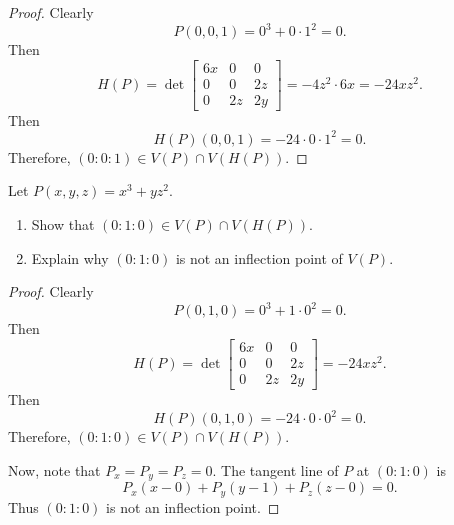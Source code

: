\begin{proof}
    Clearly 
    \[
    P(0, 0, 1) = 0^3 + 0 \cdot 1^2 = 0.
    \]
    Then 
    \[
    H(P) = \det \begin{bmatrix}
        6x & 0 & 0 \\
        0 & 0 & 2z \\
        0 & 2z & 2y
    \end{bmatrix} = -4 z^2 \cdot 6x = -24 x z^2.
    \]
    Then
    \[
    H(P)(0, 0, 1) = -24 \cdot 0 \cdot 1^2 = 0.
    \]
    Therefore, $(0 : 0 : 1) \in V(P) \cap V(H(P))$.
\end{proof}

\begin{tcolorbox}[title=Problem 27, breakable]
    Let $P(x, y, z) = x^3 + yz^2$.
    \begin{enumerate}
        \item Show that $(0 : 1 : 0) \in V(P) \cap V(H(P))$.
        \item Explain why $(0 : 1 : 0)$ is not an inflection point of $V(P)$.
    \end{enumerate}
\end{tcolorbox}

\begin{proof}
    Clearly 
    \[
    P(0, 1, 0) = 0^3 + 1 \cdot 0^2 = 0.
    \]
    Then 
    \[
    H(P) = \det \begin{bmatrix}
        6x & 0 & 0 \\
        0 & 0 & 2z \\
        0 & 2z & 2y
    \end{bmatrix} = -24 x z^2.
    \]
    Then
    \[
    H(P)(0, 1, 0) = -24 \cdot 0 \cdot 0^2 = 0.
    \]
    Therefore, $(0 : 1 : 0) \in V(P) \cap V(H(P))$.

    Now, note that $P_x = P_y = P_z = 0$.
    The tangent line of $P$ at $(0 : 1 : 0)$ is 
    \[P_x(x - 0) + P_y(y - 1) + P_z(z - 0) = 0.\]
    Thus $(0 : 1  : 0)$ is not an inflection point.
\end{proof}


